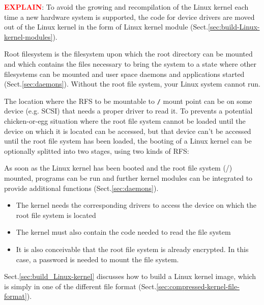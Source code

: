 \begin{mdframed}

\textcolor{red}{\bf EXPLAIN}: To avoid the growing and recompilation of the
Linux kernel each time a new hardware system is supported, the code for device
drivers are moved out of the Linux kernel in the form of Linux kernel module
(Sect.\ref{sec:build-Linux-kernel-modules}).

Root filesystem is the filesystem upon which the root directory can be mounted
and which contains the files necessary to bring the system to a state where
other filesystems can be mounted and user space daemons and applications
started (Sect.\ref{sec:daemons}). Without the root file system, your Linux
system cannot run.

The location where the RFS to be mountable to \verb!/! mount
point can be on some device (e.g. SCSI) that needs a proper driver to read it. 
To prevents a potential chicken-or-egg situation where the root file system
cannot be loaded until the device on which it is located can be accessed, but
that device can't be accessed until the root file system has been loaded, the
booting of a Linux kernel can be optionally splitted into two stages, using two
kinds of RFS:


As soon as the Linux kernel has been booted and the root file system (/) mounted,
programs can be run and further kernel modules can be integrated to provide
additional functions (Sect.\ref{sec:daemons}).

\begin{itemize}

  \item The kernel needs the corresponding drivers to access the device on which
  the root file system is located
  
  \item The kernel must also contain the code needed to read the file system
  
  \item  It is also conceivable that the root file system is already encrypted.
  In this case, a password is needed to mount the file system.

\end{itemize}




Sect.\ref{sec:build_Linux-kernel} discusses how to build a Linux kernel image,
which is simply in one of the different file format
(Sect.\ref{sec:compressed-kernel-file-format}).


\end{mdframed}
